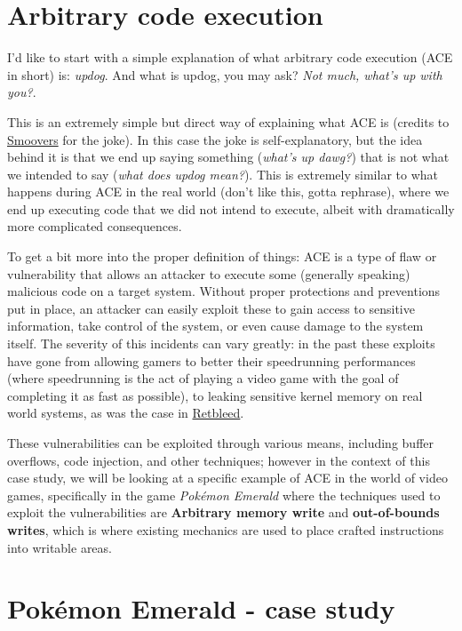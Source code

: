 \documentclass[a4paper]{usiinfbachelorproject}
\begin{document}
\section{\textbf{Arbitrary code execution}}
I'd like to start with a simple explanation of what arbitrary code execution (ACE in short) is: \textit{updog}. And what is updog, you may ask? \textit{Not much, what's up with you?}.

This is an extremely simple but direct way of explaining what ACE is (credits to \href{https://www.youtube.com/watch?v=-XmXYCXX7y4}{Smoovers} for the joke). In this case the joke is self-explanatory, but the idea behind it is that we end up saying something (\textit{what's up dawg?}) that is not what we intended to say (\textit{what does updog mean?}). This is extremely similar to what happens during ACE in the real world (don't like this, gotta rephrase), where we end up executing code that we did not intend to execute, albeit with dramatically more complicated consequences.

To get a bit more into the proper definition of things: ACE is a type of flaw or vulnerability that allows an attacker to execute some (generally speaking) malicious code on a target system. Without proper protections and preventions put in place, an attacker can easily exploit these to gain access to sensitive information, take control of the system, or even cause damage to the system itself. The severity of this incidents can vary greatly: in the past these exploits have gone from allowing gamers to better their speedrunning performances (where speedrunning is the act of playing a video game with the goal of completing it as fast as possible), to leaking sensitive kernel memory on real world systems, as was the case in \href{https://comsec.ethz.ch/research/microarch/retbleed/}{Retbleed}.

These vulnerabilities can be exploited through various means, including buffer overflows, code injection, and other techniques; however in the context of this case study, we will be looking at a specific example of ACE in the world of video games, specifically in the game \textit{Pokémon Emerald} where the techniques used to exploit the vulnerabilities are \textbf{Arbitrary memory write} and \textbf{out-of-bounds writes}, which is where existing mechanics are used to place crafted instructions into writable areas.




\section{\textbf{Pokémon Emerald - case study}}
\end{document}
